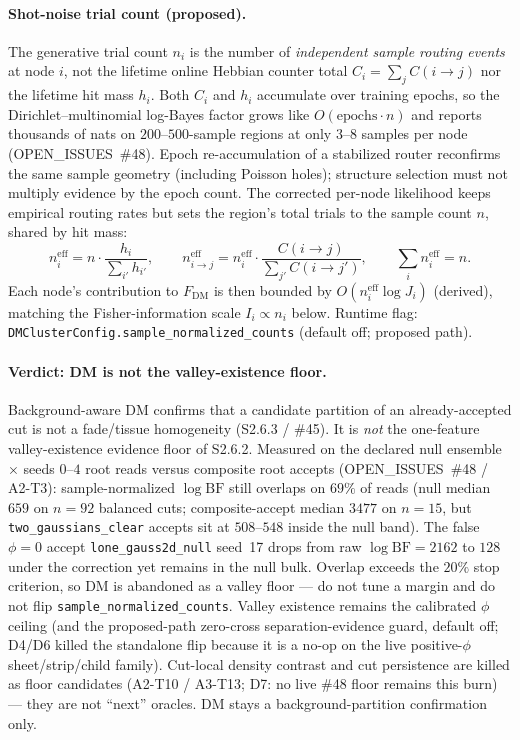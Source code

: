 \documentclass[11pt]{article}
\begin{document}
\paragraph{Shot-noise trial count (proposed).}
\label{par:si-dm-shot-noise-trials}
The generative trial count $n_i$ is the number of \emph{independent sample routing events} at node $i$, not the lifetime online Hebbian counter total $C_i=\sum_j C(i\to j)$ nor the lifetime hit mass $h_i$. Both $C_i$ and $h_i$ accumulate over training epochs, so the Dirichlet--multinomial log-Bayes factor grows like $O(\mathrm{epochs}\cdot n)$ and reports thousands of nats on $200$--$500$-sample regions at only $3$--$8$ samples per node (OPEN\_ISSUES~\#48). Epoch re-accumulation of a stabilized router reconfirms the same sample geometry (including Poisson holes); structure selection must not multiply evidence by the epoch count. The corrected per-node likelihood keeps empirical routing rates but sets the region's total trials to the sample count $n$, shared by hit mass:
\[
n_i^{\mathrm{eff}}
=
n\cdot\frac{h_i}{\sum_{i'}h_{i'}},
\qquad
n_{i\to j}^{\mathrm{eff}}
=
n_i^{\mathrm{eff}}\cdot\frac{C(i\to j)}{\sum_{j'}C(i\to j')},
\qquad
\sum_i n_i^{\mathrm{eff}}=n.
\]
Each node's contribution to $F_{\mathrm{DM}}$ is then bounded by $O(n_i^{\mathrm{eff}}\log J_i)$ (derived), matching the Fisher-information scale $I_i\propto n_i$ below. Runtime flag: \texttt{DMClusterConfig.sample\_normalized\_counts} (default off; proposed path).

\paragraph{Verdict: DM is not the valley-existence floor.}
\label{par:si-dm-not-valley-floor}
Background-aware DM confirms that a candidate partition of an already-accepted cut is not a fade/tissue homogeneity (S2.6.3 / \#45). It is \emph{not} the one-feature valley-existence evidence floor of S2.6.2. Measured on the declared null ensemble $\times$ seeds $0$--$4$ root reads versus composite root accepts (OPEN\_ISSUES~\#48 / A2-T3): sample-normalized $\log\mathrm{BF}$ still overlaps on $69\%$ of reads (null median $659$ on $n{=}92$ balanced cuts; composite-accept median $3477$ on $n{=}15$, but \texttt{two\_gaussians\_clear} accepts sit at $508$--$548$ inside the null band). The false $\phi{=}0$ accept \texttt{lone\_gauss2d\_null} seed~17 drops from raw $\log\mathrm{BF}{=}2162$ to $128$ under the correction yet remains in the null bulk. Overlap exceeds the $20\%$ stop criterion, so DM is abandoned as a valley floor --- do not tune a margin and do not flip \texttt{sample\_normalized\_counts}. Valley existence remains the calibrated $\phi$ ceiling (and the proposed-path zero-cross separation-evidence guard, default off; D4/D6 killed the standalone flip because it is a no-op on the live positive-$\phi$ sheet/strip/child family). Cut-local density contrast and cut persistence are killed as floor candidates (A2-T10 / A3-T13; D7: no live \#48 floor remains this burn) --- they are not ``next'' oracles. DM stays a background-partition confirmation only.
\end{document}
